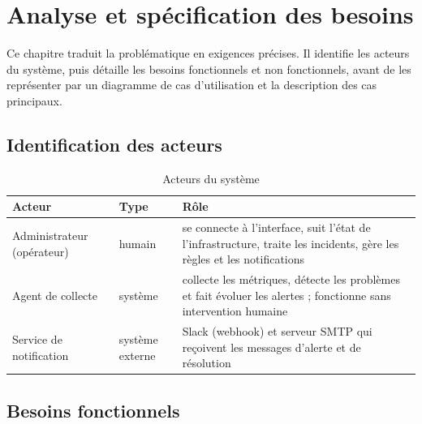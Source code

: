 \chapter{Analyse et spécification des besoins}
\label{chap:besoins}

\begin{introchapitre}
Ce chapitre traduit la problématique en exigences précises. Il identifie les acteurs du
système, puis détaille les besoins fonctionnels et non fonctionnels, avant de les représenter
par un diagramme de cas d'utilisation et la description des cas principaux.
\end{introchapitre}

\section{Identification des acteurs}

\begin{table}[htbp]
\centering
\small
\begin{tabularx}{\linewidth}{L{3.8cm}L{2.4cm}Y}
\toprule
\textbf{Acteur} & \textbf{Type} & \textbf{Rôle} \\
\midrule
Administrateur (opérateur) & humain & se connecte à l'interface, suit l'état de l'infrastructure, traite les incidents, gère les règles et les notifications \\
Agent de collecte & système & collecte les métriques, détecte les problèmes et fait évoluer les alertes ; fonctionne sans intervention humaine \\
Service de notification & système externe & Slack (webhook) et serveur SMTP qui reçoivent les messages d'alerte et de résolution \\
\bottomrule
\end{tabularx}
\caption{Acteurs du système}
\label{tab:acteurs}
\end{table}

\section{Besoins fonctionnels}

